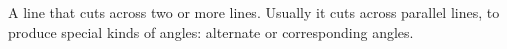 A line that cuts across two or more lines. Usually it cuts across parallel
lines, to produce special kinds of angles: alternate or corresponding angles.